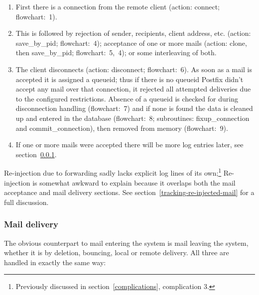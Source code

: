 \documentclass[a4paper,12pt,draft]{article}
\begin{document}
\begin{enumerate}
        
    \item First there is a connection from the remote client
        (action: connect; flowchart:~1).

    \item This is followed by rejection of sender, recipients, client
        address, etc. (action: save\_by\_pid; flowchart:~4); acceptance of
        one or more mails (action: clone, then save\_by\_pid;
        flowchart:~5,~4); or some interleaving of both.
        
    \item The client disconnects (action: disconnect; flowchart:~6).  As
        soon as a mail is accepted it is assigned a queueid; thus if there
        is no queueid Postfix didn't accept any mail over that connection,
        it rejected all attempted deliveries due to the configured
        restrictions.  Absence of a queueid is checked for during
        disconnection handling (flowchart:~7) and if none is found the data
        is cleaned up and entered in the database (flowchart:~8;
        subroutines: fixup\_connection and commit\_connection), then
        removed from memory (flowchart:~9).

    \item If one or more mails were accepted there will be more log entries
        later, see section~\ref{mail-delivery}.

\end{enumerate}

Re-injection due to forwarding sadly lacks explicit log lines of its
own;\footnote{Previously discussed in section~\ref{complications},
complication 3.}  Re-injection is somewhat awkward to explain because it
overlaps both the mail acceptance and mail delivery sections.  See
section~\ref{tracking-re-injected-mail} for a full discussion.

\subsubsection{Mail delivery}

\label{mail-delivery}

The obvious counterpart to mail entering the system is mail leaving the
system, whether it is by deletion, bouncing, local or remote delivery.  All
three are handled in exactly the same way:
\end{document}
